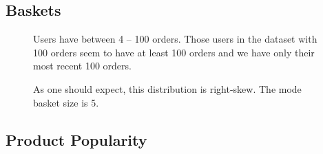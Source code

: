 \documentclass[handout]{beamer}
\begin{document}

\subsection{Baskets}

\begin{frame}
\begin{figure}[p]
\begin{center}
\caption[Histogram of order counts by user]{Users have between 4 -- 100 orders. Those users in the dataset with 100 orders seem to have at least 100 orders and we have only their most recent 100 orders.}
\label{fig:orders-histogram}
\end{center}
\end{figure}
 
\end{frame}

\begin{frame}
\begin{figure}[p]
\begin{center}
\end{center}
\caption[Histogram of basket sizes]{As one should expect, this distribution is right-skew. The mode basket size is 5.}
\label{fig:basket-size-histogram}
\end{figure} 
\end{frame}


\subsection{Product Popularity}
\end{document}
